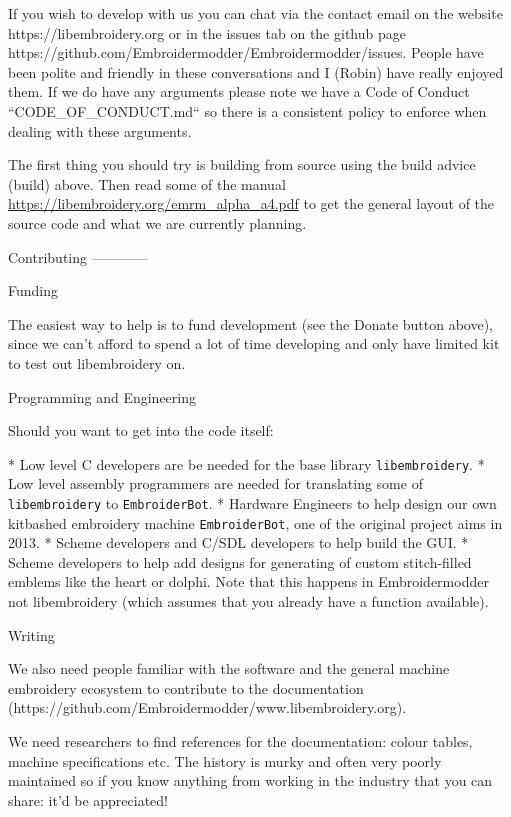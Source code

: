\documentclass[a4paper]{report}
\begin{document}
If you wish to develop with us you can chat via the contact email
on the website https://libembroidery.org or in the issues tab on the
github page https://github.com/Embroidermodder/Embroidermodder/issues.
People have been polite and friendly in these conversations and I (Robin)
have really enjoyed them.
If we do have any arguments please note we have a
Code of Conduct ``CODE\_OF\_CONDUCT.md`` so there is a consistent policy to
enforce when dealing with these arguments.

The first thing you should try is building from source using the  build advice (build)
above. Then read some of the  manual
\url{https://libembroidery.org/emrm_alpha_a4.pdf} to get the general
layout of the source code and what we are currently planning.

Contributing
------------

Funding
~~~~~~~

The easiest way to help is to fund development (see the Donate button above),
since we can't afford to spend a lot of time developing and only have limited
kit to test out libembroidery on.

Programming and Engineering
~~~~~~~~~~~~~~~~~~~~~~~~~~~

Should you want to get into the code itself:

* Low level C developers are be needed for the base library \texttt{libembroidery}.
* Low level assembly programmers are needed for translating some of \texttt{libembroidery} to \texttt{EmbroiderBot}.
* Hardware Engineers to help design our own kitbashed embroidery machine \texttt{EmbroiderBot}, one of the original project aims in 2013.
* Scheme developers and C/SDL developers to help build the GUI.
* Scheme developers to help add designs for generating of custom stitch-filled emblems like the heart or dolphi. Note that this happens in Embroidermodder not libembroidery (which assumes that you already have a function available).

Writing
~~~~~~~

We also need people familiar with the software and the general
machine embroidery ecosystem to contribute to the
documentation (https://github.com/Embroidermodder/www.libembroidery.org).

We need researchers to find references for the documentation: colour tables,
machine specifications etc. The history is murky and often very poorly maintained
so if you know anything from working in the industry that you can share: it'd be
appreciated!
\end{document}
